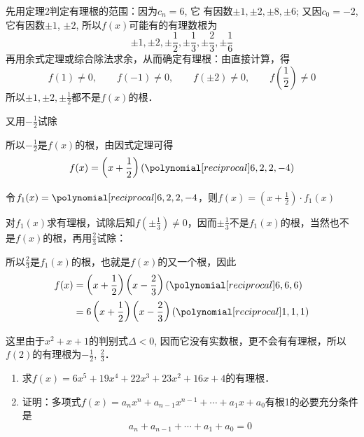 \begin{solution}
    先用定理2判定有理根的范围：因为$c_n=6$, 它
    有因数$\pm 1,\pm 2,\pm 8,\pm 6$; 又因$c_0=-2$, 它有因数$\pm 1$, 
$\pm 2$, 所以$f(x)$可能有的有理数根为
\[\pm 1, \pm 2, \pm \frac{1}{2}, \pm \frac{1}{3}, \pm \frac{2}{3}, \pm \frac{1}{6}\]
再用余式定理或综合除法求余，从而确定有理根：由直接计算，得
\[f(1)\ne 0,\qquad f(-1)\ne 0,\qquad f(\pm 2)\ne 0,\qquad f\left(\frac{1}{2}\right)\ne 0\]
所以$\pm 1,\pm 2,\pm\frac{1}{2}$都不是$f(x)$的根．

又用$-\frac{1}{2}$试除
\begin{center}
\end{center}
所以$-\frac{1}{2}$是$f(x)$的根，由因式定理可得
\[f(x)=\left(x+\frac{1}{2}\right)(\poly{6,2,2,-4})\]

令$f_1(x)=\poly{6,2,2,-4}$，则$f(x)=\left(x+\frac{1}{2}\right)\cdot f_1(x)$

对$f_1(x)$求有理根，试除后知$f\left(\pm\frac{1}{3}\right)\ne 0$，因而$\pm\frac{1}{3}$不是$f_1(x)$的根，当然也不是$f(x)$的根，再用$\frac{2}{3}$试除：
\begin{center}
\end{center}
所以$\frac{2}{3}$是$f_1(x)$的根，也就是$f(x)$的又一个根，因此
\[\begin{split}
    f(x)&=\left(x+\frac{1}{2}\right)\left(x-\frac{2}{3}\right)(\poly{6,6,6})\\
    &=6\left(x+\frac{1}{2}\right)\left(x-\frac{2}{3}\right)(\poly{1,1,1})
\end{split}\]

这里由于$x^2+x+1$的判别式$\Delta<0$, 因而它没有实数根，更不会有有理根，所以$f(2)$的有理根为$-\frac{1}{2}$, $\frac{2}{3}$．
\end{solution}

\begin{ex}
\begin{enumerate}
    \item 求$f(x)=6x^5+19x^4+22x^3+23x^2+16x+4$的有理根．
    \item 证明：多项式$f(x)=a_nx^n+a_{n-1}x^{n-1}+\cdots+a_1x+a_0$有根1的必要充分条件是
    \[ a_n+a_{n-1}+\cdots +a_1+a_0=0\]
\end{enumerate}
\end{ex}

